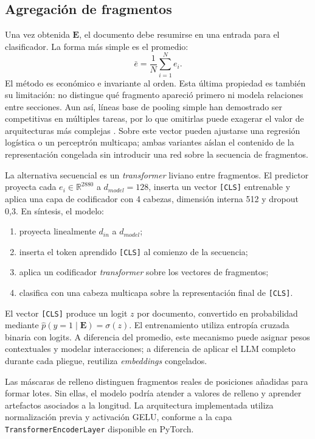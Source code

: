 \subsection{Agregación de fragmentos}

Una vez obtenida $\mathbf{E}$, el documento debe resumirse en una entrada para el clasificador. La forma más simple es el promedio:
\begin{equation}
  \bar e=\frac{1}{N}\sum_{i=1}^{N}e_i.
\end{equation}
El método es económico e invariante al orden. Esta última propiedad es también su limitación: no distingue qué fragmento apareció primero ni modela relaciones entre secciones. Aun así, líneas base de pooling simple han demostrado ser competitivas en múltiples tareas, por lo que omitirlas puede exagerar el valor de arquitecturas más complejas \parencite{shen2018swem}. Sobre este vector pueden ajustarse una regresión logística o un perceptrón multicapa; ambas variantes aíslan el contenido de la representación congelada sin introducir una red sobre la secuencia de fragmentos.

La alternativa secuencial es un \textit{transformer} liviano entre fragmentos. El predictor proyecta cada $e_i\in\mathbb{R}^{2880}$ a $d_{model}=128$, inserta un vector \texttt{[CLS]} entrenable y aplica una capa de codificador con 4 cabezas, dimensión interna 512 y dropout 0,3. En síntesis, el modelo:

\begin{enumerate}
  \item proyecta linealmente $d_{in}$ a $d_{model}$;
  \item inserta el token aprendido \texttt{[CLS]} al comienzo de la secuencia;
  \item aplica un codificador \textit{transformer} sobre los vectores de fragmentos;
  \item clasifica con una cabeza multicapa sobre la representación final de \texttt{[CLS]}.
\end{enumerate}

El vector \texttt{[CLS]} produce un logit $z$ por documento, convertido en probabilidad mediante $\hat{p}(y=1 \mid \mathbf{E}) = \sigma(z)$. El entrenamiento utiliza entropía cruzada binaria con logits. A diferencia del promedio, este mecanismo puede asignar pesos contextuales y modelar interacciones; a diferencia de aplicar el LLM completo durante cada pliegue, reutiliza \textit{embeddings} congelados.

Las máscaras de relleno distinguen fragmentos reales de posiciones añadidas para formar lotes. Sin ellas, el modelo podría atender a valores de relleno y aprender artefactos asociados a la longitud. La arquitectura implementada utiliza normalización previa y activación GELU, conforme a la capa \texttt{TransformerEncoderLayer} disponible en PyTorch.

